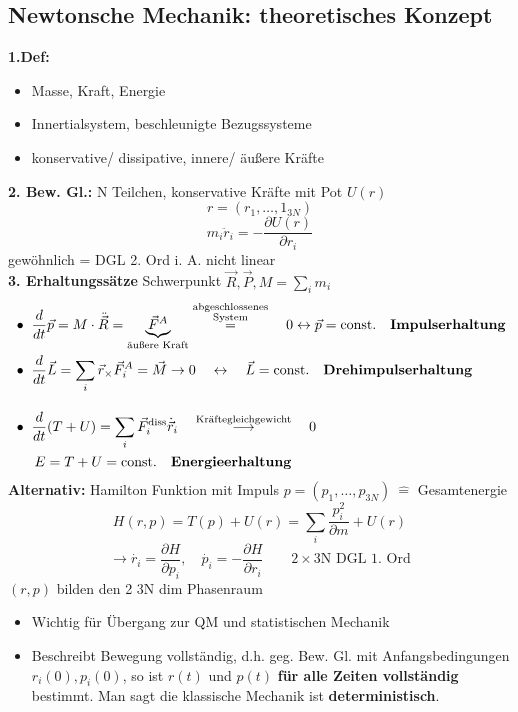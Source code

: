 \documentclass[titlepage,12pt,a4paper,ngerman]{report}
\newcommand{\tx}[1]{\textrm{#1}}
\begin{document}
\subsection*{Newtonsche Mechanik: theoretisches Konzept}
\textbf{1.Def:}
\begin{itemize}
	\item Masse, Kraft, Energie
	\item Innertialsystem, beschleunigte Bezugssysteme
	\item konservative/ dissipative, innere/ äußere Kräfte
\end{itemize}
\textbf{2. Bew. Gl.:}
N Teilchen, konservative Kräfte mit Pot $U(r)$
$$ r = (r_1, \dots, 1_{3N})$$
$$m_i\ddot{r}_i = - \frac{\partial U(r)}{\partial r_i}$$ 
gewöhnlich = DGL 2. Ord i. A. nicht linear\\
\textbf{3. Erhaltungssätze}
Schwerpunkt $\vec{R}, \vec{P}, M = \sum_i m_i$
\begin{align*}
&\bullet \ \frac{d}{dt} \vec{p} = M \cdot \ddot{\vec{R}} = \underbrace{\vec{F}^A} _{\textrm{äußere Kraft}} \buildrel\substack{ \textrm{abgeschlossenes} \\ \tx{System}} \over = \quad 0 \leftrightarrow \vec{p} = \textrm{const.} \quad  \tx{\textbf{Impulserhaltung}}\\
&\bullet \ \frac{d}{dt} \vec{L} = \sum_i \vec{r}_ \times \vec{F}_i^A = \vec{M} \rightarrow 0 \quad  \leftrightarrow \quad \vec{L} = \textrm{const.} \quad \textrm{\textbf{Drehimpulserhaltung}}\\[10pt]
&\bullet \ \frac{d}{dt} (T + U) = \sum_i \vec{F}_i^{\tx{diss}} \dot{\vec{r}}_i \quad  \buildrel\textrm{Kräftegleichgewicht} \over \longrightarrow \quad 0\\
&\indent E = T+U = \textrm{const.} \quad \textrm{\textbf{Energieerhaltung}}
\end{align*}
\textbf{Alternativ:}
Hamilton Funktion mit Impuls $p=(p_1,\dots, p_{3N}) \ \widehat{=}$ Gesamtenergie
$$H(r,p) = T(p) + U(r) = \sum_i \frac{p_i^2}{\partial m} + U(r)$$
$$\rightarrow \dot{r_i} = \frac{\partial H}{\partial p_i}, \quad \dot{p_i}= -\frac{\partial H}{\partial r_i} \qquad 2\times 3 \tx{N } \textrm{DGL 1. Ord}$$
$(r,p)$ bilden den 2 3N dim Phasenraum
\begin{itemize}
	\item Wichtig für Übergang zur QM und statistischen Mechanik
	\item Beschreibt Bewegung vollständig, d.h. geg. Bew. Gl. mit Anfangsbedingungen $r_i(0), p_i(0)$, so ist $r(t)$ und $p(t)$ \textbf{für alle Zeiten vollständig} bestimmt. Man sagt die klassische Mechanik ist \textbf{deterministisch}.
\end{itemize}
\end{document}
